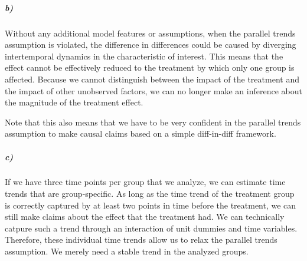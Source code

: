 \documentclass[12pt]{article}\usepackage[]{graphicx}\usepackage[]{color}
\begin{document}
\subparagraph{b)} Without any additional model features or assumptions, when the parallel trends assumption is violated, the difference in differences could be caused by diverging intertemporal dynamics in the characteristic of interest. This means that the effect cannot be effectively reduced to the treatment by which only one group is affected. Because we cannot distinguish between the impact of the treatment and the impact of other unobserved factors, we can no longer make an inference about the magnitude of the treatment effect.

Note that this also means that we have to be very confident in the parallel trends assumption to make causal claims based on a simple diff-in-diff framework.

\subparagraph{c)} If we have three time points per group that we analyze, we can estimate time trends that are group-specific. As long as the time trend of the treatment group is correctly captured by at least two points in time before the treatment, we can still make claims about the effect that the treatment had. We can technically catpure such a trend through an interaction of unit dummies and time variables. Therefore, these individual time trends allow us to relax the parallel trends assumption. We merely need a stable trend in the analyzed groups.
\end{document}

